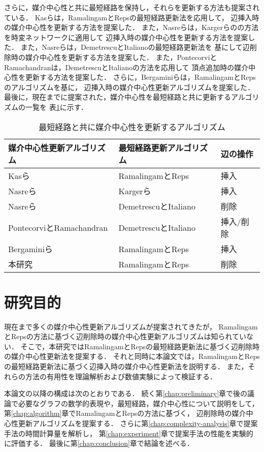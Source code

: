 さらに，媒介中心性と共に最短経路を保持し，それらを更新する方法も提案されている．
Kasらは，RamalingamとRepsの最短経路更新法\cite{Ramalingam1996}を応用して，
辺挿入時の媒介中心性を更新する方法を提案した\cite{Kas2013}．
また，Nasreらは，Kargerらの\cite{Karger1993}の方法を時変ネットワークに適用して
辺挿入時の媒介中心性を更新する方法を提案し\cite{Nasre2014a}た．
また，Nasreらは，DemetrescuとItalianoの最短経路更新法\cite{Demetrescu2003}を
基にして辺削除時の媒介中心性を更新する方法を提案した\cite{Nasre2014b}．
また，PontecorviとRamachandranは，DemetrescuとItalianoの方法を応用して
頂点追加時の媒介中心性を更新する方法を提案した\cite{Pontecorvi2015}．
さらに，Bergaminiらは，RamalingamとRepsのアルゴリズムを基に，
辺挿入時の媒介中心性更新アルゴリズムを提案した\cite{Bergamini2017}．
最後に，現在までに提案された，媒介中心性を最短経路と共に更新するアルゴリズムの一覧を
表\ref{tab:comparison-of-algorithms}に示す．

\begin{table}[tb]
  \centering
  \caption{最短経路と共に媒介中心性を更新するアルゴリズム}
  \label{tab:comparison-of-algorithms}
  \begin{tabular}{lll}
    \hline
    媒介中心性更新アルゴリズム & 最短経路更新アルゴリズム & 辺の操作 \\ \hline
    Kasら\cite{Kas2013} & RamalingamとReps\cite{Ramalingam1996} & 挿入 \\ \hline
    Nasreら\cite{Nasre2014a} & Kargerら\cite{Karger1993} & 挿入 \\ \hline
    Nasreら\cite{Nasre2014b} & DemetrescuとItaliano\cite{Demetrescu2003} & 削除 \\ \hline
    PontecorviとRamachandran\cite{Pontecorvi2015} & DemetrescuとItaliano\cite{Demetrescu2003} & 挿入/削除 \\ \hline
    Bergaminiら\cite{Bergamini2017} & RamalingamとReps\cite{Ramalingam1996} & 挿入 \\ \hline
    本研究 & RamalingamとReps\cite{Ramalingam1996} & 削除 \\ \hline
  \end{tabular}
\end{table}

\section{研究目的}

現在まで多くの媒介中心性更新アルゴリズムが提案されてきたが，
RamalingamとRepsの方法に基づく辺削除時の媒介中心性更新アルゴリズムは知られていない．
そこで，本研究ではRamalingamとRepsの最短経路更新法に基づく辺削除時の媒介中心性更新法を提案する．
それと同時に本論文では，RamalingamとRepsの最短経路更新法に基づく辺挿入時の媒介中心性更新法を説明する．
また，それらの方法の有用性を理論解析および数値実験によって検証する．

本論文の以降の構成は次のとおりである．
続く第\ref{chap:preliminary}章で後の議論で必要なグラフの数学的表現や，最短経路，媒介中心性について説明をして，
第\ref{chap:algorithm}章でRamalingamとRepsの方法に基づく，
辺削除時の媒介中心性更新アルゴリズムを提案する．
さらに第\ref{chap:complexity-analysis}章で提案手法の時間計算量を解析し，
第\ref{chap:experiment}章で提案手法の性能を実験的に評価する．
最後に第\ref{chap:conclusion}章で結論を述べる．
